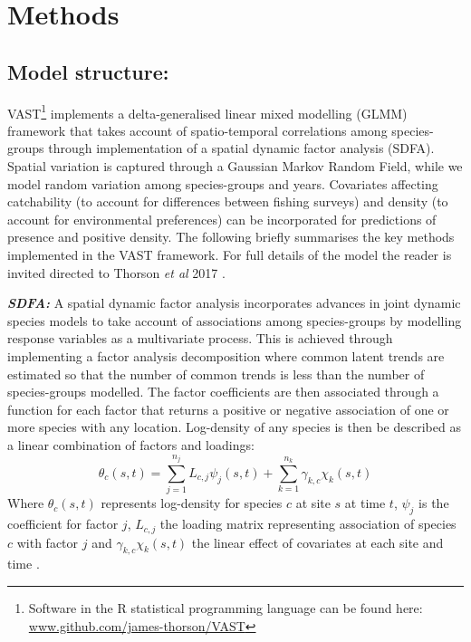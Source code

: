 \documentclass{nature}
\begin{document}
\section*{Methods}

\subsection{Model structure:} 

VAST\footnote{Software in the R statistical programming language can be found
	here: \url{www.github.com/james-thorson/VAST}} implements a
delta-generalised linear mixed modelling (GLMM) framework that takes account of
spatio-temporal correlations among species-groups through implementation of a
spatial dynamic factor analysis (SDFA). Spatial variation is captured through a
Gaussian Markov Random Field, while we model random variation among
species-groups and years. Covariates affecting catchability (to account for
differences between fishing surveys) and density (to account for environmental
preferences) can be incorporated for predictions of presence and positive
density. The following briefly summarises the key methods implemented in the
VAST framework. For full details of the model the reader is invited directed to
Thorson \textit{et al} 2017 \cite{Thorson2017}.

\textbf{\textit{SDFA:}} A spatial dynamic factor analysis incorporates advances
in joint dynamic species models \cite{Thorson2017} to take account of
associations among species-groups by modelling response variables as a
multivariate process. This is achieved through implementing a factor analysis
decomposition where common latent trends are estimated so that the number of
common trends is less than the number of species-groups modelled. The factor
coefficients are then associated through a function for each factor that
returns a positive or negative association of one or more species with any
location. Log-density of any species is then be described as a linear
combination of factors and loadings:
	\begin{equation}
		\theta_{c}(s,t) = \sum_{j=1}^{n_{j}}
		L_{c,j}\psi_{j}(s,t) +\sum_{k=1}^{n_{k}}
		\gamma_{k,c}\chi_{k}(s,t)
	\end{equation}
Where $\theta_{c}(s,t)$ represents log-density for species $c$ at site $s$ at
time $t$, $\psi_{j}$ is the coefficient for factor $j$, $L_{c,j}$ the loading
matrix representing association of species $c$ with factor $j$ and
$\gamma_{k,c}\chi_{k}(s,t)$ the linear effect of covariates at each site and
time \cite{Thorson2016b}. 
\end{document}
